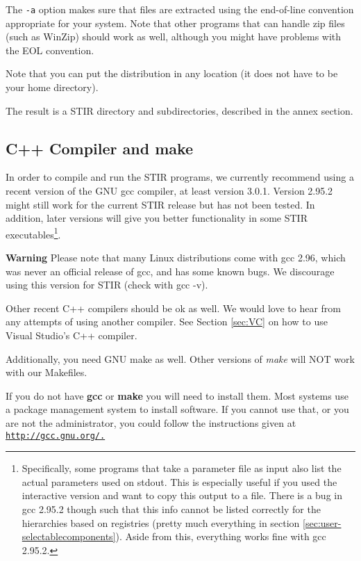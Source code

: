 \documentclass{article}
\def\R2Lurl#1#2{\mbox{\href{#1}{\tt #2}}}
\begin{document}
The \texttt{-a} option makes sure that files are extracted using the 
end-of-line convention appropriate for your system. Note that 
other programs that can handle zip files (such as WinZip) should 
work as well, although you might have problems with the EOL convention.


Note that you can put the distribution in any location (it does 
not have to be your home directory).


The result is a STIR directory and subdirectories, described 
in the annex section.


\subsection{
C++ Compiler and make}

In order to compile and run the STIR programs, we currently recommend 
using a recent version of the GNU gcc compiler, at least version 
3.0.1. Version 2.95.2 might still work for the current STIR release 
but has not been tested. In addition, later versions will give 
you better functionality in some STIR executables\footnote{{\small Specifically, 
some programs that take a parameter file as input also list the 
actual parameters used on stdout. This is especially useful if 
you used the interactive version and want to copy this output 
to a file. There is a bug in gcc 2.95.2 though such that this 
info cannot be listed correctly for the hierarchies based on 
registries (pretty much everything in section 
\ref{sec:user-selectablecomponents}). 
Aside from this, 
everything works fine with gcc 2.95.2.}}. 


\textbf{Warning} Please note that many Linux distributions come with 
gcc 2.96, which was never an official release of gcc, and has 
some known bugs. We discourage using this version for STIR (check 
with gcc -v).



Other recent C++ compilers should be ok as well. We would love 
to hear from any attempts of using another compiler. See Section 
\ref{sec:VC}
on how to use Visual Studio's C++ compiler.


Additionally, you need GNU make as well. Other versions of \textit{make} 
will NOT work with our Makefiles.


If you do not have \textbf{gcc} or \textbf{make} you will need to 
install them. Most systems use a package management system to install software. 
If you cannot use that, or you are not the administrator, you 
could follow the instructions given at \R2Lurl{http://gcc.gnu.org/ }{http://gcc.gnu.org/.}
\end{document}
